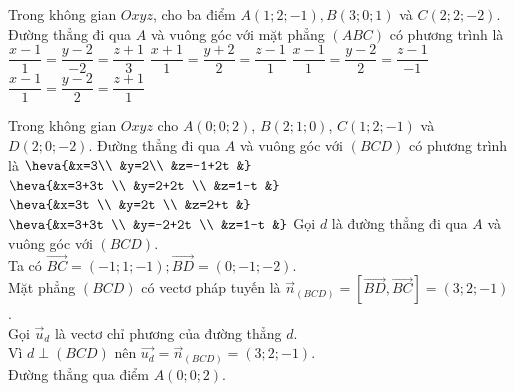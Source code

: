 \begin{ex}%
	Trong không gian $Oxyz$, cho ba điểm $A(1; 2;-1), B(3; 0; 1)$ và $C(2; 2;-2)$. Đường thẳng đi qua $A$ và vuông góc với mặt phẳng $(ABC)$ có phương trình là
	\choice
	{\True $\dfrac{x-1}{1}=\dfrac{y-2}{-2}=\dfrac{z+1}{3}$}
	{$\dfrac{x+1}{1}=\dfrac{y+2}{2}=\dfrac{z-1}{1}$}
	{$\dfrac{x-1}{1}=\dfrac{y-2}{2}=\dfrac{z-1}{-1}$}
	{$\dfrac{x-1}{1}=\dfrac{y-2}{2}=\dfrac{z+1}{1}$}
\end{ex}
\begin{ex}%
	Trong không gian $Oxyz$ cho $A(0; 0; 2)$, $B(2; 1; 0)$, $C(1; 2;-1)$ và $D(2; 0;-2)$. Đường thẳng đi qua $A$ và vuông góc với $(BCD)$ có phương trình là
	\choice
	{$\heva{&x=3\\
			&y=2\\
			&z=-1+2t
			&}$}
	{\True $\heva{&x=3+3t \\
			&y=2+2t \\
			&z=1-t
			&}$}
	{$\heva{&x=3t \\
			&y=2t \\
			&z=2+t
			&}$}
	{$\heva{&x=3+3t \\
			&y=-2+2t \\
			&z=1-t
			&}$}
	\loigiai
		{Gọi $d$ là đường thẳng đi qua $A$ và vuông góc với $(BCD)$.\\
		Ta có $\overrightarrow{BC}=(-1; 1;-1); \overrightarrow{BD}=(0;-1;-2)$.\\
		Mặt phẳng $(BCD)$ có vectơ pháp tuyến là $\overrightarrow{n}_{(BCD)}=\left[\overrightarrow{BD}, \overrightarrow{BC}\right]=(3; 2;-1)$.\\
		Gọi $\overrightarrow{u}_d$ là vectơ chỉ phương của đường thẳng $d$.\\
		Vì $d \perp(BCD)$ nên $\overrightarrow{u_d}=\overrightarrow{n}_{(BCD)}=(3; 2;-1)$.\\
		Đường thẳng qua điểm $A(0; 0; 2)$.
	}
\end{ex}
